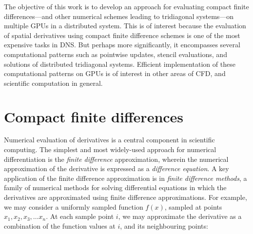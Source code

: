 The objective of this work is to develop an
approach for evaluating
compact finite differences---and
other numerical schemes leading to tridiagonal systems---on
multiple GPUs in a distributed system.
This is of interest because
the evaluation of spatial derivatives using
compact finite difference schemes is one of the most
expensive tasks in DNS.
But perhaps more significantly,
it encompasses several computational patterns
such as pointwise updates, stencil evaluations,
and solutions of distributed tridiagonal systems.
Efficient implementation of these computational patterns
on GPUs is of interest in other areas of CFD,
and scientific computation in general.

\section{Compact finite differences}

Numerical evaluation of derivatives is a central component
in scientific computing.
The simplest and most widely-used approach for numerical differentiation
is the \emph{finite difference} approximation,
wherein the numerical approximation of the derivative
is expressed as a \emph{difference equation}.
A key application of the finite difference approximation
is in \emph{finite difference methods},
a family of numerical methods for solving differential equations
in which the derivatives are approximated using
finite difference approximations.
%
For example, we may consider a uniformly sampled
function $f(x)$,
sampled at points $x_1, x_2, x_3, \hdots x_n$.
At each sample point $i$, we may approximate the derivative as
a combination of the function values at
$i$, and its neighbouring points:

